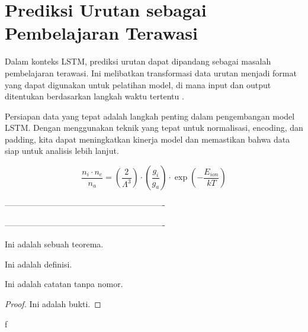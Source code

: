 \section{Prediksi Urutan sebagai Pembelajaran Terawasi}
\par Dalam konteks LSTM, prediksi urutan dapat dipandang sebagai masalah pembelajaran terawasi. Ini melibatkan transformasi data urutan menjadi format yang dapat digunakan untuk pelatihan model, di mana input dan output ditentukan berdasarkan langkah waktu tertentu \parencite{brownlee2017}.


\par Persiapan data yang tepat adalah langkah penting dalam pengembangan model LSTM. Dengan menggunakan teknik yang tepat untuk normalisasi, encoding, dan padding, kita dapat meningkatkan kinerja model dan memastikan bahwa data siap untuk analisis lebih lanjut.

\begin{equation}
    \frac{n_i \cdot n_e}{n_a} = \left( \frac{2}{\Lambda^3} \right) \cdot \left( \frac{g_i}{g_a} \right) \cdot \exp \left( -\frac{E_{ion}}{kT} \right)
    \label{eq:rate}
\end{equation}


----------------------------------------------------------%

----------------------------------------------------------




\begin{theorem}
Ini adalah sebuah teorema.
\end{theorem}

\begin{definition}
Ini adalah definisi.
\end{definition}

\begin{remark}
Ini adalah catatan tanpa nomor.
\end{remark} 

\begin{proof}
Ini adalah bukti.
\end{proof}
 \begin{example}
        f
 \end{example}


